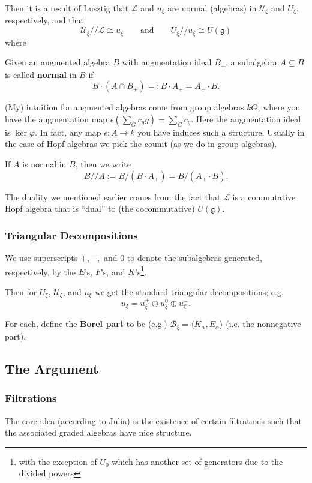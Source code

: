\documentclass[12pt]{article}
\theoremstyle{nonumberbreak}
\theoremstyle{changebreak}
\theoremstyle{nonumberplain}
\theoremstyle{change}
\newcommand*{\g}{\mathfrak{g}}
\begin{document}
Then it is a result of Lusztig that $\mathscr L$ and $u_\xi$ are normal (algebras) in $\mathscr U_\xi$ and $U_\xi$, respectively,
and that 
\[\mathscr U_\xi//\mathscr L\cong u_\xi\qquad\text{and}\qquad U_\xi//u_\xi\cong U(\g)\]
where
\begin{defn}
	Given an augmented algebra $B$ with augmentation ideal $B_+$, a subalgebra $A\subseteq B$ is called \textbf{normal} in $B$ if 
	\[B\cdot (A\cap B_+)=:B\cdot A_+=A_+\cdot B.\]
\end{defn}

(My) intuition for augmented algebras come from group algebras $kG$, where you have the augmentation map $\epsilon(\sum_G c_gg)=\sum_G c_g$.
Here the augmentation ideal is $\ker\varphi$. In fact, any map $\epsilon:A\to k$ you have induces such a structure. Usually in the case of Hopf algebras
we pick the counit (as we do in group algebras).

\begin{defn}
	If $A$ is normal in $B$, then we write 
	\[B//A:=B/(B\cdot A_+)=B/(A_+\cdot B).\]
\end{defn}

The duality we mentioned earlier comes from the fact that $\mathscr L$ is a commutative Hopf algebra that is ``dual'' to (the cocommutative) $U(\g)$.

\subsubsection{Triangular Decompositions}
We use superscripts $+,-,$ and $0$ to denote the subalgebras generated, respectively, by the $E$'s, $F$'s, and $K$'s\footnote{with the exception of $U_0$ which has another set of generators due to the divided powers}.

Then for $U_\xi$, $\mathscr U_\xi$, and $u_\xi$ we get the standard triangular decompositions; e.g.
\[u_\xi = u_\xi^+\oplus u_\xi^0\oplus u_\xi^-.\]

For each, define the \textbf{Borel part} to be (e.g.) $\mathscr B_\xi=\langle K_\alpha, E_\alpha\rangle$ (i.e. the nonnegative part).

\subsection{The Argument}
\subsubsection{Filtrations}
The core idea (according to Julia) is the existence of certain filtrations such that the associated graded algebras have nice structure.
\end{document}
